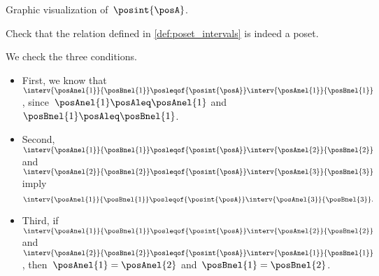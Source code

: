 \begin{marginfigure}
    \begin{center}
    \end{center}
    \caption{Graphic visualization of~$\posint{\posA}$.
    }
\end{marginfigure}

\begin{exercise}
    Check that the relation defined in \cref{def:poset_intervals} is indeed a poset.
\end{exercise}
\begin{solution}
    We check the three conditions.
    \begin{itemize}
        \item First, we know that~$\interv{\posAnel{1}}{\posBnel{1}}\posleqof{\posint{\posA}}\interv{\posAnel{1}}{\posBnel{1}}$, since~$\posAnel{1}\posAleq \posAnel{1}$ and~$\posBnel{1}\posAleq \posBnel{1}$.
        \item Second,~$\interv{\posAnel{1}}{\posBnel{1}}\posleqof{\posint{\posA}}\interv{\posAnel{2}}{\posBnel{2}}$ and~$\interv{\posAnel{2}}{\posBnel{2}}\posleqof{\posint{\posA}}\interv{\posAnel{3}}{\posBnel{3}}$ imply
              \begin{equation}
                  \interv{\posAnel{1}}{\posBnel{1}}\posleqof{\posint{\posA}}\interv{\posAnel{3}}{\posBnel{3}}.
              \end{equation}
        \item Third, if~$\interv{\posAnel{1}}{\posBnel{1}}\posleqof{\posint{\posA}}\interv{\posAnel{2}}{\posBnel{2}}$ and~$\interv{\posAnel{2}}{\posBnel{2}}\posleqof{\posint{\posA}}\interv{\posAnel{1}}{\posBnel{1}}$, then~$\posAnel{1}=\posAnel{2}$ and~$\posBnel{1}=\posBnel{2}$.
    \end{itemize}
\end{solution}
\vfill
\clearpage
